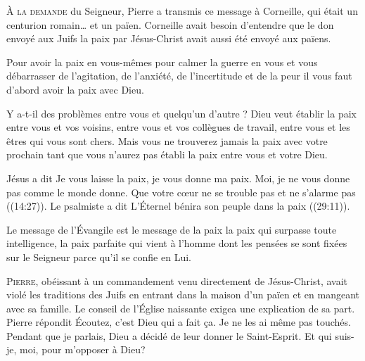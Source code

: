 
\lettrine{À}{ la demande} du Seigneur, Pierre a transmis ce message à Corneille,
 qui était un centurion romain\dots{} et un païen.
 Corneille avait besoin d'entendre que le don envoyé aux Juifs
 \ocadr la paix par Jésus-Christ \fcadr{} avait aussi été envoyé aux païens.

Pour avoir la paix en vous-mêmes \ocadr pour calmer la guerre en vous
 et vous débarrasser de l'agitation, de l'anxiété, de l'incertitude
 et de la peur \fcadr{} il vous faut d'abord avoir la paix avec Dieu.


Y a-t-il des problèmes entre vous et quelqu'un d'autre ?
 Dieu veut établir la paix entre vous et vos voisins,
 entre vous et vos collègues de travail,
 entre vous et les êtres qui vous sont chers.
 Mais vous ne trouverez jamais la paix avec votre prochain
 tant que vous n'aurez pas établi la paix entre vous et votre Dieu.

Jésus a dit\frcolon{} 
 \Og Je vous laisse la paix, je vous donne ma paix.
 Moi, je ne vous donne pas comme le monde donne.
 Que votre c\oe{}ur ne se trouble pas et ne s'alarme pas \Fg{}
 ((14:27)).
 Le psalmiste a dit\frcolon{} 
 \Og L'Éternel bénira son peuple dans la paix \Fg{}
 ((29:11)).

Le message de l'Évangile est le message de la paix
 \ocadr la paix qui surpasse toute intelligence,
 la paix parfaite qui vient à l'homme dont les pensées
 se sont fixées sur le Seigneur parce qu'il se confie en Lui.

\dvrule






\lettrine{P}{ierre}, obéissant à un commandement venu directement
 de Jésus-Christ,
 avait violé les traditions des Juifs en entrant
 dans la maison d'un païen et en mangeant avec sa famille.
 Le conseil de l'Église naissante exigea une explication de sa part.
 Pierre répondit\frcolon{} 
 \Og Écoutez, c'est Dieu qui a fait \c{c}a. Je ne les ai même pas touchés.
 Pendant que je parlais, Dieu a décidé de leur donner le Saint-Esprit.
 Et qui suis-je, moi, pour m'opposer à Dieu? \Fg{}

